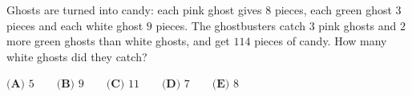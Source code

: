 Ghosts are turned into candy: each pink ghost gives $8$ pieces, each green ghost $3$ pieces and each white ghost $9$ pieces. The ghostbusters catch $3$ pink ghosts and $2$ more green ghosts than white ghosts, and get $114$ pieces of candy. How many white ghosts did they catch?

$\textbf{(A) }5\qquad\textbf{(B) }9\qquad\textbf{(C) }11\qquad\textbf{(D) }7\qquad\textbf{(E) }8$
